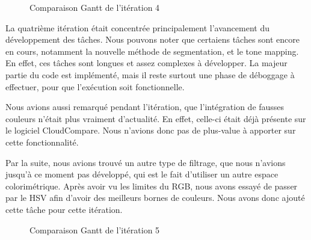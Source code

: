 \documentclass[12pt,titlepage,french]{article}
\begin{document}
\begin{figure}[H]
    \caption{\label{} Comparaison Gantt de l'itération 4}
\end{figure}

La quatrième itération était concentrée principalement l'avancement du développement des tâches. Nous pouvons noter que certaiens tâches sont encore en cours, notamment la nouvelle méthode de segmentation, et le tone mapping. En effet, ces tâches sont longues et assez complexes à développer. La majeur partie du code est implémenté, mais il reste surtout une phase de déboggage à effectuer, pour que l'exécution soit fonctionnelle. \newline

Nous avions aussi remarqué pendant l'itération, que l'intégration de fausses couleurs n'était plus vraiment d'actualité. En effet, celle-ci était déjà présente sur le logiciel CloudCompare. Nous n'avions donc pas de plus-value à apporter sur cette fonctionnalité. \newline

Par la suite, nous avions trouvé un autre type de filtrage, que nous n'avions jusqu'à ce moment pas développé, qui est le fait d'utiliser un autre espace colorimétrique. Après avoir vu les limites du RGB, nous avons essayé de passer par le HSV afin d'avoir des meilleurs bornes de couleurs. Nous avons donc ajouté cette tâche pour cette itération.

\begin{figure}[H]
    \caption{\label{} Comparaison Gantt de l'itération 5}
\end{figure}
\end{document}
